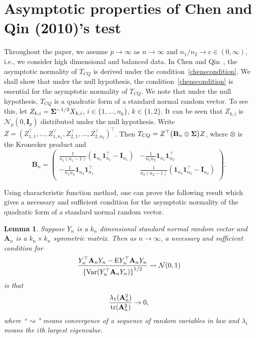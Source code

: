 \documentclass[times,sort&compress,3p]{elsarticle}
\newcommand{\mytr}{ {\rm tr} }
\newcommand{\myE}{ {\rm E} }
\newcommand{\myVar}{ {\rm Var} }
\newcommand{\BA}{\mathbf{A}}    \newcommand{\BB}{\mathbf{B}}    \newcommand{\BC}{\mathbf{C}}    \newcommand{\BD}{\mathbf{D}}    \newcommand{\BE}{\mathbf{E}}    \newcommand{\BF}{\mathbf{F}}    \newcommand{\BG}{\mathbf{G}}    \newcommand{\BH}{\mathbf{H}}    \newcommand{\BI}{\mathbf{I}}    \newcommand{\BJ}{\mathbf{J}}    \newcommand{\BK}{\mathbf{K}}    \newcommand{\BL}{\mathbf{L}}
\theoremstyle{plain}
\newtheorem{lemma}{\quad\quad Lemma}
\theoremstyle{definition}
\theoremstyle{remark}
\begin{document}
\section{Asymptotic properties of Chen and Qin (2010)'s test}\label{sec:chen}
Throughout the paper, we  assume $p\to \infty$ as $n\to \infty$ and ${n_1}/{n_2}\to c \in (0,\infty)$, i.e., we consider high dimensional and balanced data.
    In Chen and Qin~\cite{Chen2010A}, the asymptotic normality of $T_{CQ}$ is derived under the condition~\eqref{chenscondition}.
    We shall show that under the null hypothesis, the condition~\eqref{chenscondition} is essential for the asymptotic normality of $T_{CQ}$.
We note that under the null hypothesis, $T_{CQ}$ is a quadratic form of a standard normal random vector.
To see this,
let $Z_{k,i}=\boldsymbol{\Sigma}^{-1/2}X_{k,i}$, $i\in \{1,\ldots,n_k \}$, $k\in \{1,2\}$.
It can be seen that $Z_{k,i}$ is $ \mathcal{N}_p(0,\BI_{p})$ distributed under the null hypothesis.
Write $Z=(Z_{1,1}^\top ,\ldots,Z_{1,n_1}^\top ,Z_{2,1}^\top ,\ldots,Z_{2,n_2}^\top )^\top $.
    Then 
        $
        T_{CQ}=Z^\top  \big( \BB_n\otimes \bSigma \big) Z
        $,
    where $\otimes$ is the Kronecker product and
    \begin{equation*}
        \BB_n=\begin{pmatrix}
            \displaystyle \frac{1}{n_1(n_1-1)}(\mathbf{1}_{n_1} \mathbf{1}_{n_1}^\top -\BI_{n_1})& \displaystyle 
            -\frac{1}{n_1 n_2}\mathbf{1}_{n_1} \mathbf{1}_{n_2}^\top \\
\displaystyle 
            -\frac{1}{n_1 n_2}\mathbf{1}_{n_2} \mathbf{1}_{n_1}^\top &
\displaystyle 
            \frac{1}{n_2(n_2-1)}( \mathbf{1}_{n_2} \mathbf{1}_{n_2}^\top -\BI_{n_2})\\
        \end{pmatrix}.
    \end{equation*}
    
Using characteristic function method, one can prove the following result which gives a necessary and sufficient condition for the asymptotic normality of the quadratic form of a standard normal random vector.
\begin{lemma}\label{quadraticFormCLT}
    Suppose $Y_{n}$ is a $k_n$ dimensional standard normal random vector and $\BA_n$ is a $k_n\times k_n$ symmetric matrix. Then as $n\to \infty$, a necessary and sufficient condition for
    \begin{equation}\label{quadratic}
        \frac{Y_n^\top  \BA_n Y_n- \myE Y_n^\top  \BA_n Y_n}{\left\{\myVar (Y_n^\top  \BA_n Y_n)\right\}^{1/2}}\rightsquigarrow \mathcal{N}(0,1)
    \end{equation}
    is that
    \begin{equation}\label{quadraticEigen}
        \frac{\lambda_{1}(\BA_n^2)}{\mytr(\BA_n^2)}\to 0,
    \end{equation}
    where ``$\rightsquigarrow $" means convergence of a sequence of random variables in law and $\lambda_{i}$ means the $i$th largest eigenvalue.
\end{lemma}
\end{document}
